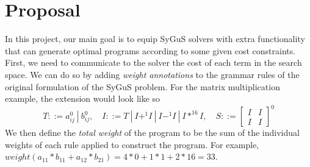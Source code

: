 \section{Proposal}
\label{sec:proposal}
%
In this project, our main goal is to equip SyGuS solvers with extra functionality that can generate optimal programs according to some given cost constraints.
%
First, we need to communicate to the solver the cost of each term in the search space.
%
We can do so by adding \emph{weight annotations} to the grammar rules of the original formulation of the SyGuS problem.
%
For the matrix multiplication example, the extension would look like so
%
\[
T ::= a_{ij}^0 \ | \ b_{ij}^0, \quad
I ::= T \ | \ I +^1 I \ | \ I -^1 I \ | \ I *^{16} I, \quad
S ::=
\begin{bmatrix} I & I \\
I & I
\end{bmatrix}^0
\]
%
We then define the \emph{total weight} of the program to be the sum of the individual weights of each rule applied to construct the program. For example, $weight(a_{11} * b_{11} + a_{12} * b_{21}) = 4*0 + 1*1 + 2* 16 = 33$.
%

